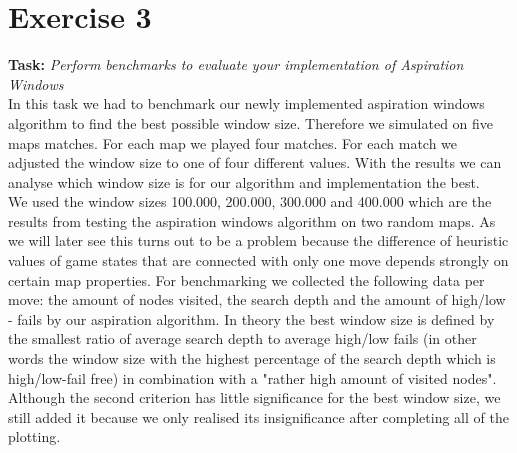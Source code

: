 \section*{Exercise 3}

\textbf{Task:} \textit{Perform benchmarks to evaluate your implementation of Aspiration
Windows} \\

\noindent In this task we had to benchmark our newly implemented aspiration windows algorithm to find the best possible window size. Therefore we simulated on five maps matches. For each map we played four matches. For each match we adjusted the window size to one of four different values. With the results we can analyse which window size is for our algorithm and implementation the best.\\

\noindent We used the window sizes 100.000, 200.000, 300.000 and 400.000 which are the results from testing the aspiration windows algorithm on two random maps. As we will later see this turns out to be a problem because the difference of heuristic values of game states that are connected with only one move depends strongly on certain map properties. For benchmarking we collected the following data per move: the amount of nodes visited, the search depth and the amount of high/low - fails by our aspiration algorithm. In theory the best window size is defined by the smallest ratio of average search depth to average high/low fails (in other words the window size with the highest percentage of the search depth which is high/low-fail free) in combination with a "rather high amount of visited nodes". Although the second criterion has little significance for the best window size, we still added it because we only realised its insignificance after completing all of the plotting.\\

